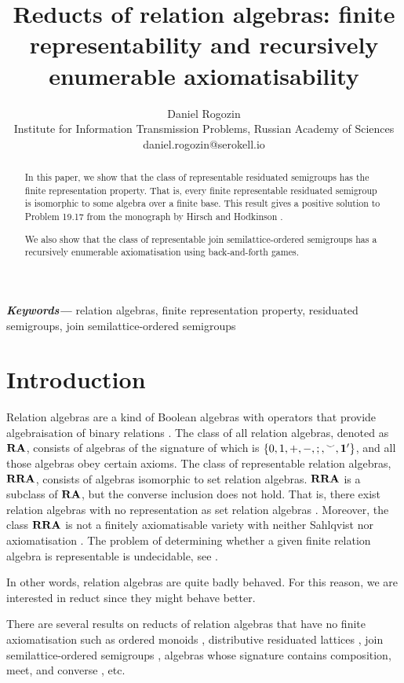 \documentclass[a4paper]{article}
\author{Daniel Rogozin \\ Institute for Information Transmission Problems, Russian Academy of Sciences \\ daniel.rogozin@serokell.io}
\date{}
\title{Reducts of relation algebras: finite representability and recursively enumerable axiomatisability}
\theoremstyle{definition}
\theoremstyle{theorem}
\theoremstyle{proposition}
\theoremstyle{lemma}
\theoremstyle{ex}
\theoremstyle{corollary}
\theoremstyle{claim}
\providecommand{\keywords}[1]{\textbf{\textit{Keywords---}} #1}
\begin{document}
\maketitle

\begin{abstract}
In this paper, we show that the class of representable residuated semigroups has the finite representation property. That is, every finite representable residuated semigroup is isomorphic to some algebra over a finite base. This result gives a positive solution to Problem 19.17 from the monograph by Hirsch and Hodkinson \cite{hirsch2002relation}.

We also show that the class of representable join semilattice-ordered semigroups has a recursively
enumerable axiomatisation using back-and-forth games.
\end{abstract}

\keywords{relation algebras, finite representation property, residuated semigroups, join semilattice-ordered semigroups}

\section{Introduction}

Relation algebras are a kind of Boolean algebras with operators that provide algebraisation
of binary relations \cite{jonsson1951boolean}. The class of all relation algebras,
denoted as ${\bf RA}$, consists of algebras of the signature of which is $\{ 0, 1, +, -, ;, {}^{\smile}, {\bf 1}' \}$, and all those algebras obey certain axioms.
The class of representable relation algebras, ${\bf RRA}$, consists of algebras isomorphic to set relation algebras. ${\bf RRA}$ is a subclass of ${\bf RA}$, but the converse inclusion does not hold.
That is, there exist relation algebras with no representation as set relation algebras
\cite{lyndon1950representation}. Moreover, the class ${\bf RRA}$ is not a finitely axiomatisable variety \cite{monk1964representable} with neither Sahlqvist \cite{venema1997atom} nor axiomatisation \cite{hodkinson2005canonical}. The problem of determining whether a given finite relation algebra
is representable is undecidable, see \cite{hirsch2001representability}.

In other words, relation algebras are quite badly behaved. For this reason, we are interested in reduct since they might behave better.

There are several results on reducts of relation algebras that have no finite axiomatisation such as ordered monoids \cite{hirsch2005class}, distributive residuated lattices \cite{andreka1994lambek}, join semilattice-ordered semigroups \cite{andreka2011axiomatizability}, algebras whose signature contains composition, meet, and converse \cite{hodkinson2000axiomatizability}, etc.
\end{document}
